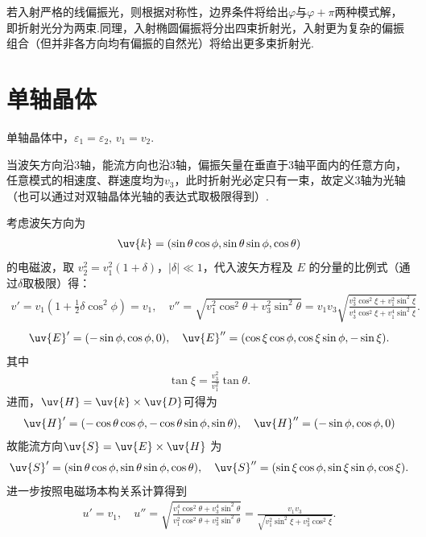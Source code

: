 若入射严格的线偏振光，则根据对称性，边界条件将给出\(\varphi\)与\(\varphi+\pi\)两种模式解，即折射光分为两束.同理，入射椭圆偏振将分出四束折射光，入射更为复杂的偏振组合（但并非各方向均有偏振的自然光）将给出更多束折射光.


\section{单轴晶体}

单轴晶体中，\(\varepsilon_1=\varepsilon_2,\, v_1=v_2\).

当波矢方向沿3轴，能流方向也沿3轴，偏振矢量在垂直于3轴平面内的任意方向，任意模式的相速度、群速度均为\(v_3\)，此时折射光必定只有一束，故定义3轴为光轴（也可以通过对双轴晶体光轴的表达式取极限得到）.

考虑波矢方向为
\begin{align*}
	\uv{k} = (\sin\theta \cos\phi, \sin\theta \sin\phi, \cos\theta)
\end{align*}
的电磁波，取 \(v_2^2 = v_1^2 (1 + \delta)\)，\(|\delta| \ll 1\)，代入波矢方程及 \(E\) 的分量的比例式（通过\(\delta\)取极限）得：
\begin{align*}
	v' = v_1 \left(1 + \frac{1}{2} \delta \cos^2\phi\right) = v_1, \quad v'' = \sqrt{v_1^2 \cos^2\theta + v_3^2 \sin^2\theta} = v_1 v_3 \sqrt{\frac{v_3^2 \cos^2\xi + v_1^2 \sin^2\xi}{v_3^4 \cos^2\xi + v_1^4 \sin^2\xi}}.
\end{align*}
\begin{align*}
	\uv{E}' = (-\sin\phi, \cos\phi, 0), \quad \uv{E}'' = (\cos\xi \cos\phi, \cos\xi \sin\phi, -\sin\xi).
\end{align*}
其中
\begin{align*}
	\tan\xi = \frac{v_3^2}{v_1^2} \tan\theta.
\end{align*}
进而，\(\uv{H}=\uv{k} \times \uv{D}\)可得为
\begin{align*}
	\uv{H}' = (-\cos\theta \cos\phi, -\cos\theta \sin\phi, \sin\theta), \quad
	\uv{H}'' = (-\sin\phi, \cos\phi, 0)
\end{align*}
故能流方向\(\uv{S}=\uv{E} \times \uv{H}\) 为
\begin{align*}
	\uv{S}' = (\sin\theta \cos\phi, \sin\theta \sin\phi, \cos\theta), \quad \uv{S}'' = (\sin\xi \cos\phi, \sin\xi \sin\phi, \cos\xi).
\end{align*}
进一步按照电磁场本构关系计算得到
\begin{align*}
	u' = v_1, \quad u'' = \sqrt{\frac{v_1^4 \cos^2\theta + v_3^4 \sin^2\theta}{v_1^2 \cos^2\theta + v_3^2 \sin^2\theta}} = \frac{v_1 v_3}{\sqrt{v_1^2 \sin^2\xi + v_3^2 \cos^2\xi}}.
\end{align*}

